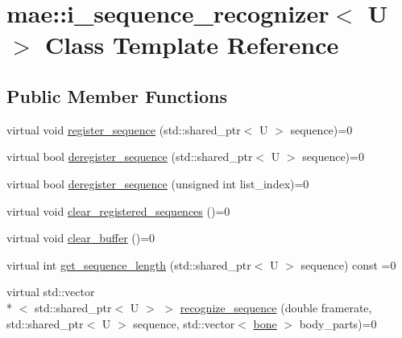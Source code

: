 \hypertarget{classmae_1_1i__sequence__recognizer}{\section{mae\-:\-:i\-\_\-sequence\-\_\-recognizer$<$ U $>$ Class Template Reference}
\label{classmae_1_1i__sequence__recognizer}
}
\subsection*{Public Member Functions}
\begin{DoxyCompactItemize}
\item 
virtual void \hyperlink{classmae_1_1i__sequence__recognizer_ac3e87eabdeec0e8cd9d083d1cb67274f}{register\-\_\-sequence} (std\-::shared\-\_\-ptr$<$ U $>$ sequence)=0
\item 
virtual bool \hyperlink{classmae_1_1i__sequence__recognizer_a23681e6e91a56a02db5942869e3bb57b}{deregister\-\_\-sequence} (std\-::shared\-\_\-ptr$<$ U $>$ sequence)=0
\item 
virtual bool \hyperlink{classmae_1_1i__sequence__recognizer_a3c809ed240ff511a881efe38a6f174d8}{deregister\-\_\-sequence} (unsigned int list\-\_\-index)=0
\item 
virtual void \hyperlink{classmae_1_1i__sequence__recognizer_a19a8b974b8920c64508ae13d91662366}{clear\-\_\-registered\-\_\-sequences} ()=0
\item 
virtual void \hyperlink{classmae_1_1i__sequence__recognizer_ad12aba56cfd627135308fe674e4bf833}{clear\-\_\-buffer} ()=0
\item 
virtual int \hyperlink{classmae_1_1i__sequence__recognizer_a5d3e370dc45d9914dcb07b33f730336e}{get\-\_\-sequence\-\_\-length} (std\-::shared\-\_\-ptr$<$ U $>$ sequence) const =0
\item 
virtual std\-::vector\\*
$<$ std\-::shared\-\_\-ptr$<$ U $>$ $>$ \hyperlink{classmae_1_1i__sequence__recognizer_a8013670ca210f801bc8940bb2a541f21}{recognize\-\_\-sequence} (double framerate, std\-::shared\-\_\-ptr$<$ U $>$ sequence, std\-::vector$<$ \hyperlink{classmae_1_1bone}{bone} $>$ body\-\_\-parts)=0
\end{DoxyCompactItemize}


